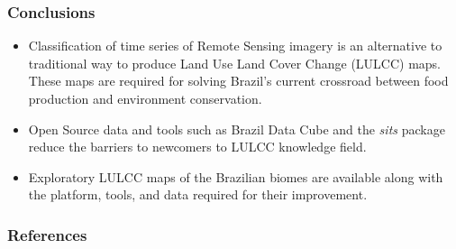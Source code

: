 \documentclass[aspectratio=169]{beamer}
\begin{document}
\begin{frame}
    \frametitle{Conclusions}
    \begin{itemize}
        \item Classification of time series of Remote Sensing imagery is an 
            alternative to traditional way to produce Land Use Land Cover 
            Change (LULCC) maps. These maps are required for solving Brazil's 
            current crossroad between food production and environment 
            conservation.
        \item Open Source data and tools such as Brazil Data Cube and the 
            \emph{sits} package reduce the barriers to newcomers to LULCC 
            knowledge field.
        \item Exploratory LULCC maps of the Brazilian biomes are available 
            along with the platform, tools, and data required for their 
            improvement.
    \end{itemize}
\end{frame}




\begin{frame}[allowframebreaks]
    \frametitle{References}
    
    
\end{frame}
\end{document}
